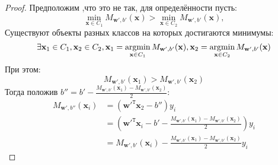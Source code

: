 \documentclass[%
bachelor,    %
subf,        %
href,        %
colorlinks,  %
]{disser}
\let\vec=\mathbf
\DeclareMathOperator*{\argmin}{argmin}
\begin{document}
\begin{proof}
Предположим ,что это не так, для определённости пусть: $$\min_{\vec{x} \in C_1} M_{\vec{w}',b'}(\vec{x}) > \min_{\vec{x} \in C_2} M_{\vec{w}',b'}(\vec{x}),$$  Существуют объекты разных классов на которых достигаются минимумы:
$$ \exists \vec{x}_1 \in C_1, \vec{x}_2 \in C_2,\\
\vec{x}_1 = \argmin_{\vec{x} \in C_1}M_{\vec{w}',b'}(\vec{x}) , \vec{x}_2 = \argmin_{\vec{x} \in C_2}M_{\vec{w}',b'}(\vec{x})$$
При этом:$$M_{\vec{w}',b'}(\vec{x}_1)>M_{\vec{w}',b'}(\vec{x}_2)$$
Тогда положив $b'' = b' - \frac{M_{\vec{w}',b'}(\vec{x}_1)-M_{\vec{w}',b'}(\vec{x}_2)}{2} $:
\begin{equation*}
\begin{aligned}
M_{\vec{w}',b''}(\vec{x}_i) &=(\vec{w}'^{\mathtt{T}}\vec{x}_2 -  b'')y_i \\
&=(\vec{w}'^{\mathtt{T}}\vec{x}_i -  b' - \frac{M_{\vec{w}',b'}(\vec{x}_1)-M_{\vec{w}',b'}(\vec{x}_2)}{2})y_i \\
&=M_{\vec{w}',b'}(\vec{x}_i) - \frac{M_{\vec{w}',b'}(\vec{x}_1)-M_{\vec{w}',b'}(\vec{x}_2)}{2}y_i 
\end{aligned}
\end{equation*}


\end{proof}
\end{document}
